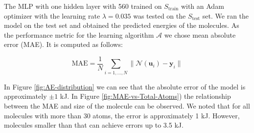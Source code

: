 The MLP with one hidden layer with 560 trained on $S_{\text{train}}$ with an Adam optimizer with the learning rate $\lambda = 0.035$ was tested on the $S_{\text{test}}$ set. We ran the model on the test set and obtained the predicted energies of the molecules. As the performance metric for the learning algorithm $\mathcal{A}$ we chose mean absolute error (MAE). It is computed as follows:

\begin{equation}
    \text{MAE} = \frac{1}{N} \sum_{i=1,\dots, N}
        \parallel
            \mathcal{N} (\textbf{u}_i) - \textbf{y}_i
        \parallel
\end{equation}

In Figure \ref{fig:AE-distribution} we can see that the absolute error of the model is approximately $\pm 1$ kJ. In Figure \ref{fig:MAE-vs-Total-Atoms}) the relationship between the MAE and size of the molecule can be observed. We noted that for all molecules with more than 30 atoms, the error is approximately 1 kJ. However, molecules smaller than that can achieve errors up to 3.5 kJ.

\begin{Figure}
    \centering
    
    \captionsetup{width=.9\linewidth}
    \label{fig:AE-distribution}
\end{Figure}

\begin{Figure}
    \centering
    
    \captionsetup{width=.9\linewidth}
    \label{fig:MAE-vs-Total-Atoms}
\end{Figure}